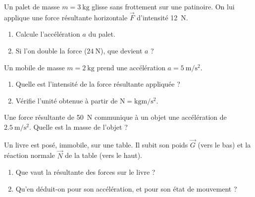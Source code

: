 \documentclass[11pt,a4paper]{article}
\newcommand{\vv}[1]{\vec{#1}}\newcommand{\ds}{\displaystyle}
\begin{document}

\begin{exo}[deuxième loi : $a=F/m$]
Un palet de masse $m=\qty{3}{\kilogram}$ glisse sans frottement sur une patinoire. On lui applique
une force résultante horizontale $\vv F$ d'intensité \qty{12}{\newton}.
\begin{center}
\end{center}
\begin{enumerate}[label=\alph*)]
  \item Calcule l'accélération $a$ du palet.
  \item Si l'on double la force ($\qty{24}{\newton}$), que devient $a$ ?
\end{enumerate}
\end{exo}

\begin{exo}[deuxième loi : $F=ma$]
Un mobile de masse $m=\qty{2}{\kilogram}$ prend une accélération $a=\qty{5}{\metre\per\second\squared}$.
\begin{enumerate}[label=\alph*)]
  \item Quelle est l'intensité de la force résultante appliquée ?
  \item Vérifie l'unité obtenue à partir de $\si{\newton}=\si{\kilogram\metre\per\second\squared}$.
\end{enumerate}
\end{exo}

\begin{exo}
Une force résultante de \qty{50}{\newton} communique à un objet une accélération de
$\qty{2,5}{\metre\per\second\squared}$. Quelle est la masse de l'objet ?
\end{exo}

\begin{exo}
Un livre est posé, immobile, sur une table. Il subit son poids $\vv G$ (vers le bas) et la réaction
normale $\vv N$ de la table (vers le haut).
\begin{center}
\end{center}
\begin{enumerate}[label=\alph*)]
  \item Que vaut la résultante des forces sur le livre ?
  \item Qu'en déduit-on pour son accélération, et pour son état de mouvement ?
\end{enumerate}
\end{exo}
\end{document}

